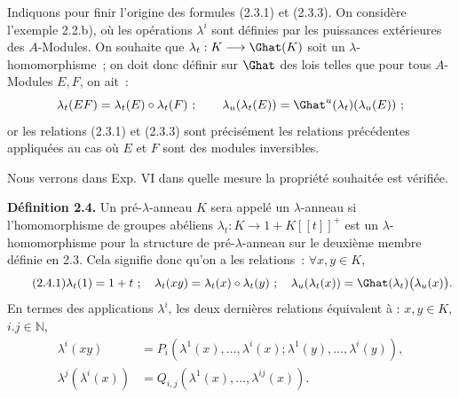 Indiquons pour finir l'origine des formules (2.3.1) et (2.3.3). On considère l'exemple 2.2.b), où les opérations \(\lambda^i\) sont définies par les puissances extérieures des \(A\)-Modules. On souhaite que \(\lambda_t:K\longrightarrow\Ghat(K)\) soit un \(\lambda\)-homomorphisme~; on doit donc définir sur \(\Ghat\) des lois telles que pour tous \(A\)-Modules \(E,F\), on ait~:
\[
  \lambda_t(EF)=\lambda_t(E)\circ\lambda_t(F)~;\qquad
  \lambda_u(\lambda_t(E))=\Ghat^u(\lambda_t)(\lambda_u(E))~;
\]
or les relations (2.3.1) et (2.3.3) sont précisément les relations précédentes appliquées au cas où \(E\) et \(F\) sont des modules inversibles.

Nous verrons dans Exp. VI dans quelle mesure la propriété souhaitée est vérifiée.

\textbf{Définition 2.4.} Un pré-\(\lambda\)-anneau \(K\) sera appelé un \(\lambda\)-anneau si l'homomorphisme de groupes abéliens \(\lambda_t:K\longrightarrow1+K[[t]]^+\) est un \(\lambda\)-homomorphisme pour la structure de pré-\(\lambda\)-anneau sur le deuxième membre définie en 2.3. Cela signifie donc qu'on a les relations~: \(\forall x,y\in K\),
\begin{equation}\tag{2.4.1}
  \lambda_t(1)=1+t~;\quad
  \lambda_t(xy)=\lambda_t(x)\circ\lambda_t(y)~;\quad
  \lambda_u(\lambda_t(x))=\Ghat(\lambda_t)\bigl(\lambda_u(x)\bigr).
\end{equation}
En termes des applications \(\lambda^i\), les deux dernières relations équivalent à : \(x,y\in K\), \(i.j\in\mathbb N\),
\begin{align}
  \lambda^i(xy)
  &=P_i(\lambda^1(x),\ldots,\lambda^i(x);
       \lambda^1(y),\ldots,\lambda^i(y)), \tag{2.4.2}\\
  \lambda^j(\lambda^i(x))
  &=Q_{i,j}(\lambda^1(x),\ldots,\lambda^{ij}(x)). \tag{2.4.3}
\end{align}

